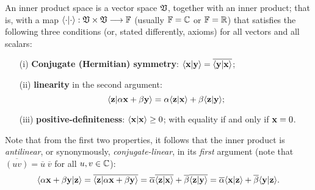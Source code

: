 An inner product space is a vector space $\frak V$,
together with an inner product; that is, with a map
 $\langle \cdot \vert \cdot \rangle :  \frak V  \times  \frak V  \longrightarrow {\Bbb F}$
 (usually ${\Bbb F}={\Bbb C}$ or ${\Bbb F}={\Bbb R}$)
 that satisfies the following three conditions (or, stated differently, axioms) for all vectors  and all scalars:
\begin{itemize}
\item[(i)]
{\bf Conjugate (Hermitian) symmetry}:
$
\langle {\bf x}\vert {\bf y}\rangle
=
\overline{\langle {\bf y}\vert {\bf x}\rangle }$;
\item[(ii)]
{\bf linearity} in the second argument:
$$
\langle {\bf z}  \vert \alpha{\bf x} + \beta {\bf y} \rangle
=
\alpha {\langle {\bf z}\vert {\bf x}\rangle}
+
\beta {\langle {\bf z}\vert {\bf y}\rangle}
;
$$
\item[(iii)]
\label{2016-m-ch-fdvs-pd}
{\bf positive-definiteness}:
$
\langle {\bf x}\vert {\bf x}\rangle
\ge
0$;  with equality if and only if ${\bf x} = 0$.
\end{itemize}

Note that from the first two properties, it follows that the inner product is
{\em antilinear}, or synonymously,
{\em conjugate-linear}, in its {\em first} argument (note that $\overline{(uv)}= \overline{u} {\;} \overline{v} $ for all $u,v\in {\Bbb C}$):
\begin{equation}
\begin{split}
 \langle \alpha {\bf x} + \beta {\bf y}   \vert {\bf z}\rangle
 =
 \overline{\langle   {\bf z} \vert \alpha {\bf x} + \beta {\bf y}\rangle }
 =
 \overline{ \alpha}\overline{\langle {\bf z} \vert {\bf x} \rangle}
 + \overline{\beta }\overline{\langle {\bf z} \vert {\bf y} \rangle}
 =
 \overline{\alpha} {\langle {\bf x}\vert {\bf z}\rangle}
 +\overline{\beta} {\langle {\bf y}\vert {\bf z}\rangle}
.
\end{split}
\end{equation}



